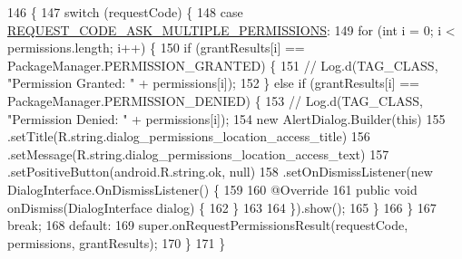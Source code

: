 \begin{DoxyCode}
146                                                                         \{
147         \textcolor{keywordflow}{switch} (requestCode) \{
148             \textcolor{keywordflow}{case} \hyperlink{classit_1_1unibo_1_1torsello_1_1bluetoothpositioning_1_1activities_1_1MainActivity_a319aed5cdd5724e043302babe5fcfeac_a319aed5cdd5724e043302babe5fcfeac}{REQUEST\_CODE\_ASK\_MULTIPLE\_PERMISSIONS}:
149                 \textcolor{keywordflow}{for} (\textcolor{keywordtype}{int} i = 0; i < permissions.length; i++) \{
150                     \textcolor{keywordflow}{if} (grantResults[i] == PackageManager.PERMISSION\_GRANTED) \{
151 \textcolor{comment}{//                        Log.d(TAG\_CLASS, "Permission Granted: " + permissions[i]);}
152                     \} \textcolor{keywordflow}{else} \textcolor{keywordflow}{if} (grantResults[i] == PackageManager.PERMISSION\_DENIED) \{
153 \textcolor{comment}{//                        Log.d(TAG\_CLASS, "Permission Denied: " + permissions[i]);}
154                         \textcolor{keyword}{new} AlertDialog.Builder(\textcolor{keyword}{this})
155                                 .setTitle(R.string.dialog\_permissions\_location\_access\_title)
156                                 .setMessage(R.string.dialog\_permissions\_location\_access\_text)
157                                 .setPositiveButton(android.R.string.ok, null)
158                                 .setOnDismissListener(\textcolor{keyword}{new} DialogInterface.OnDismissListener() \{
159 
160                                     @Override
161                                     \textcolor{keyword}{public} \textcolor{keywordtype}{void} onDismiss(DialogInterface dialog) \{
162                                     \}
163 
164                                 \}).show();
165                     \}
166                 \}
167                 \textcolor{keywordflow}{break};
168             \textcolor{keywordflow}{default}:
169                 super.onRequestPermissionsResult(requestCode, permissions, grantResults);
170         \}
171     \}
\end{DoxyCode}
\hypertarget{classit_1_1unibo_1_1torsello_1_1bluetoothpositioning_1_1activities_1_1MainActivity_a98db4478d28cd91118138d0b652ceb2c_a98db4478d28cd91118138d0b652ceb2c}{}\label{classit_1_1unibo_1_1torsello_1_1bluetoothpositioning_1_1activities_1_1MainActivity_a98db4478d28cd91118138d0b652ceb2c_a98db4478d28cd91118138d0b652ceb2c} 
